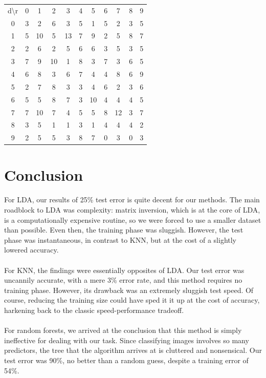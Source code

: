 \documentclass[10pt]{extarticle}
\begin{document}
\begin{minipage}{.4\textwidth}
\begin{tabular}{c c c c c c c c c c c}
 d\textbackslash r&0&1&2&3&4&5&6&7&8&9\\
 0&3&2&6&3&5&1&5&2&3&5\\
 1&5&10&5&13&7&9&2&5&8&7\\
 2&2&6&2&5&6&6&3&5&3&5\\
 3&7&9&10&1&8&3&7&3&6&5\\
 4&6&8&3&6&7&4&4&8&6&9\\
 5&2&7&8&3&3&4&6&2&3&6\\
 6&5&5&8&7&3&10&4&4&4&5\\
 7&7&10&7&4&5&5&8&12&3&7\\
 8&3&5&1&1&3&1&4&4&4&2\\
 9&2&5&5&3&8&7&0&3&0&3
 \end{tabular}
\end{minipage}


\section{Conclusion}
For LDA, our results of 25\% test error is quite decent for our methods. The main roadblock to LDA was complexity: matrix inversion, which is at the core of LDA, is a computationally expensive routine, so we were forced to use a smaller dataset than possible. Even then, the training phase was sluggish. However, the test phase was instantaneous, in contrast to KNN, but at the cost of a slightly lowered accuracy. \\\\
For KNN, the findings were essentially opposites of LDA. Our test error was uncannily accurate, with a mere 3\% error rate, and this method requires no training phase. However, its drawback was an extremely sluggish test speed. Of course, reducing the training size could have sped it it up at the cost of accuracy, harkening back to the classic speed-performance tradeoff. \\\\
For random forests, we arrived at the conclusion that this method is simply ineffective for dealing with our task. Since classifying images involves so many predictors, the tree that the algorithm arrives at is cluttered and nonsensical. Our test error was 90\%, no better than a random guess, despite a training error of 54\%. 
\end{document}
